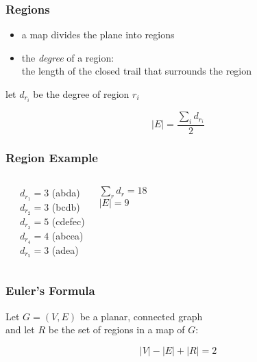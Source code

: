 \documentclass[dvipsnames]{beamer}
\begin{document}
\begin{frame}
  \frametitle{Regions}

  \begin{itemize}
    \item a map divides the plane into \alert{regions}
    \item the \emph{degree} of a region:\\
      the length of the closed trail that surrounds the region
  \end{itemize}

  \pause
  \begin{theorem}
    let $d_{r_i}$ be the degree of region $r_i$

    \[ |E| = \frac{\sum_i d_{r_i}}{2} \]
  \end{theorem}
\end{frame}

\begin{frame}
  \frametitle{Region Example}

  \begin{example}
    \begin{columns}
      \begin{center}
      \end{center}

      $d_{r_1} = 3$ (abda)\\
      $d_{r_2} = 3$ (bcdb)\\
      $d_{r_3} = 5$ (cdefec)\\
      $d_{r_4} = 4$ (abcea)\\
      $d_{r_5} = 3$ (adea)

      \medskip
      $\sum_r d_r = 18$\\
      $|E| = 9$
    \end{columns}
  \end{example}
\end{frame}

\begin{frame}
  \frametitle{Euler's Formula}

  \begin{theorem}
    Let $G=(V,E)$ be a planar, connected graph\\
    and let $R$ be the set of regions in a map of $G$:

    \[|V| - |E| + |R| = 2\]
  \end{theorem}
\end{frame}
\end{document}
